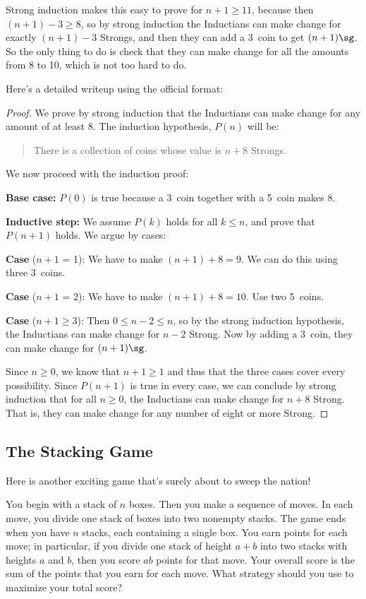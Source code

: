 Strong induction makes this easy to prove for $n+1 \ge 11$, because then
$(n+1)-3 \ge 8$, so by strong induction the Inductians can make change for
exactly $(n+1)-3$ Strongs, and then they can add a 3\sg\ coin to get
$(n+1)\sg$.  So the only thing to do is check that they can make change
for all the amounts from 8 to 10\sg, which is not too hard to do.

Here's a detailed writeup using the official format:

\begin{proof}

  We prove by strong induction that the Inductians can make change for any
  amount of at least 8\sg.  The induction hypothesis, $P(n)$ will be:
\begin{quote}
There is a collection of coins whose value is $n+8$ Strongs.
\end{quote}

We now proceed with the induction proof:

\textbf{Base case:} $P(0)$ is true because a 3\sg\ coin together with
a 5\sg\ coin makes 8\sg.

\textbf{Inductive step:}  We assume $P(k)$ holds for all $k \leq n$, and
prove that $P(n+1)$ holds.  We argue by cases:

\textbf{Case} ($n+1$ = 1): We have to make $(n+1) +8 =9$\sg.  We can do this using three 3\sg\ coins.

\textbf{Case} ($n+1$ = 2): We have to make $(n+1) +8 =10$\sg.  Use two
5\sg\ coins.

\textbf{Case} ($n+1 \geq 3$): Then $0 \leq n - 2 \leq n$, so by the
strong induction hypothesis, the Inductians can make change for $n-2$
Strong.  Now by adding a 3\sg\ coin, they can make change for
$(n+1)\sg$.

Since $n \ge 0$, we know that $n + 1 \ge 1$ and thus that the three cases
cover every possibility.  Since $P(n+1)$ is true in every case, we can
conclude by strong induction
that for all $n \ge 0$, the Inductians can make change for $n+8$
Strong.  That is, they can make change for any number of eight or more
Strong.
\end{proof}

\subsection{The Stacking Game}

Here is another exciting game that's surely about to sweep the
nation!

You begin with a stack of $n$ boxes.  Then you
make a sequence of moves.  In each move, you divide one stack of boxes
into two nonempty stacks.  The game ends when you have $n$ stacks, each
containing a single box.  You earn points for each move; in particular, if
you divide one stack of height $a + b$ into two stacks with heights $a$
and $b$, then you score $ab$ points for that move.  Your overall score is
the sum of the points that you earn for each move.  What strategy should
you use to maximize your total score?

